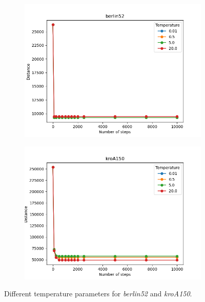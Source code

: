 \begin{figure}[!htb]
	\centering
	\begin{subfigure}{0.45\textwidth}
		\includegraphics[width=\textwidth]{img/berlin52_temperature}
	\end{subfigure}
	\begin{subfigure}{0.45\textwidth}
		\includegraphics[width=\textwidth]{img/kroA150_temperature}
	\end{subfigure}
	\caption{Different temperature parameters for \textit{berlin52} and \textit{kroA150}.}
	\label{fig:temperature_1}
\end{figure}

